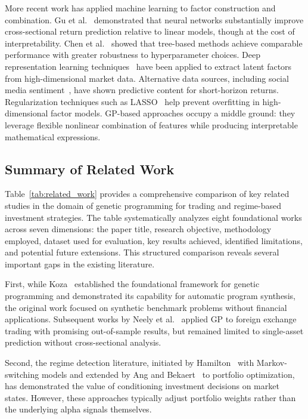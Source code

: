 \documentclass{ieeeaccess}
\begin{document}
More recent work has applied machine learning to factor construction and combination. Gu et al.~\cite{b19} demonstrated that neural networks substantially improve cross-sectional return prediction relative to linear models, though at the cost of interpretability. Chen et al.~\cite{b20} showed that tree-based methods achieve comparable performance with greater robustness to hyperparameter choices. Deep representation learning techniques~\cite{b30} have been applied to extract latent factors from high-dimensional market data. Alternative data sources, including social media sentiment~\cite{b27}, have shown predictive content for short-horizon returns. Regularization techniques such as LASSO~\cite{b29} help prevent overfitting in high-dimensional factor models. GP-based approaches occupy a middle ground: they leverage flexible nonlinear combination of features while producing interpretable mathematical expressions.

\subsection{Summary of Related Work}
Table~\ref{tab:related_work} provides a comprehensive comparison of key related studies in the domain of genetic programming for trading and regime-based investment strategies. The table systematically analyzes eight foundational works across seven dimensions: the paper title, research objective, methodology employed, dataset used for evaluation, key results achieved, identified limitations, and potential future extensions. This structured comparison reveals several important gaps in the existing literature.

First, while Koza~\cite{b6} established the foundational framework for genetic programming and demonstrated its capability for automatic program synthesis, the original work focused on synthetic benchmark problems without financial applications. Subsequent works by Neely et al.~\cite{b9} applied GP to foreign exchange trading with promising out-of-sample results, but remained limited to single-asset prediction without cross-sectional analysis.

Second, the regime detection literature, initiated by Hamilton~\cite{b7} with Markov-switching models and extended by Ang and Bekaert~\cite{b14} to portfolio optimization, has demonstrated the value of conditioning investment decisions on market states. However, these approaches typically adjust portfolio weights rather than the underlying alpha signals themselves.
\end{document}
